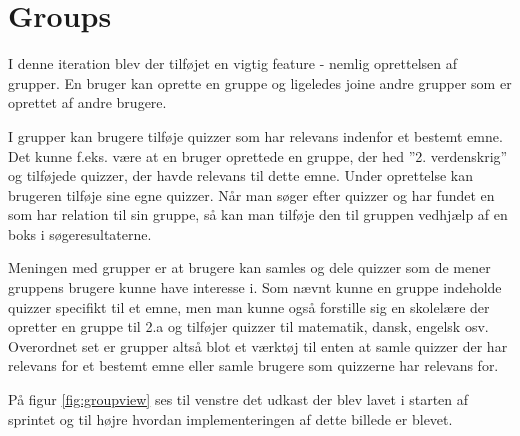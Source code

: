 \section{Groups}

I denne iteration blev der tilføjet en vigtig feature - nemlig oprettelsen af grupper.
En bruger kan oprette en gruppe og ligeledes joine andre grupper som er oprettet af andre brugere.

I grupper kan brugere tilføje quizzer som har relevans indenfor et bestemt emne. Det kunne f.eks. være at en bruger oprettede en gruppe, der hed ''2. verdenskrig'' og tilføjede quizzer, der havde relevans til dette emne. Under oprettelse kan brugeren tilføje sine egne quizzer. Når man søger efter quizzer og har fundet en som har relation til sin gruppe, så kan man tilføje den til gruppen vedhjælp af en boks i søgeresultaterne.

Meningen med grupper er at brugere kan samles og dele quizzer som de mener gruppens brugere kunne have interesse i.  Som nævnt kunne en gruppe indeholde quizzer specifikt til et emne, men man kunne også forstille sig en skolelære der opretter en gruppe til 2.a og tilføjer quizzer til matematik, dansk, engelsk osv. Overordnet set er grupper altså blot et værktøj til enten at samle quizzer der har relevans for et bestemt emne eller samle brugere som quizzerne har relevans for.


På figur \ref{fig:groupview} ses til venstre det udkast der blev lavet i starten af sprintet og til højre hvordan implementeringen af dette billede er blevet.